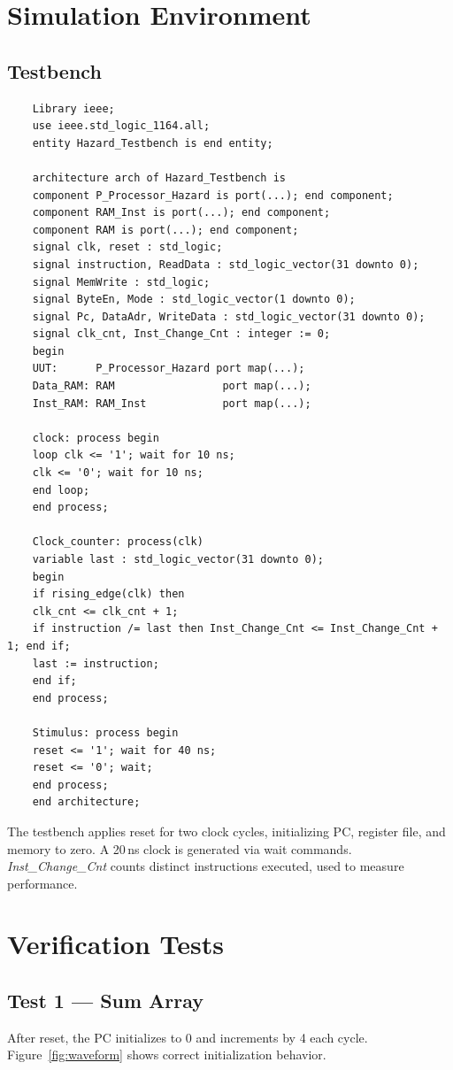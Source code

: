 \section{Simulation Environment}
\subsection{Testbench}
\begin{verbatim}
	Library ieee;
	use ieee.std_logic_1164.all;
	entity Hazard_Testbench is end entity;
	
	architecture arch of Hazard_Testbench is
	component P_Processor_Hazard is port(...); end component;
	component RAM_Inst is port(...); end component;
	component RAM is port(...); end component;
	signal clk, reset : std_logic;
	signal instruction, ReadData : std_logic_vector(31 downto 0);
	signal MemWrite : std_logic;
	signal ByteEn, Mode : std_logic_vector(1 downto 0);
	signal Pc, DataAdr, WriteData : std_logic_vector(31 downto 0);
	signal clk_cnt, Inst_Change_Cnt : integer := 0;
	begin
	UUT:      P_Processor_Hazard port map(...);
	Data_RAM: RAM                 port map(...);
	Inst_RAM: RAM_Inst            port map(...);
	
	clock: process begin
	loop clk <= '1'; wait for 10 ns;
	clk <= '0'; wait for 10 ns;
	end loop;
	end process;
	
	Clock_counter: process(clk)
	variable last : std_logic_vector(31 downto 0);
	begin
	if rising_edge(clk) then
	clk_cnt <= clk_cnt + 1;
	if instruction /= last then Inst_Change_Cnt <= Inst_Change_Cnt + 1; end if;
	last := instruction;
	end if;
	end process;
	
	Stimulus: process begin
	reset <= '1'; wait for 40 ns;
	reset <= '0'; wait;
	end process;
	end architecture;
\end{verbatim}

The testbench applies reset for two clock cycles, initializing PC, register file, and memory to zero. A 20\,ns clock is generated via wait commands. \textit{Inst\_Change\_Cnt} counts distinct instructions executed, used to measure performance.

\section{Verification Tests}

\subsection{Test 1 — Sum Array}
After reset, the PC initializes to 0 and increments by 4 each cycle. Figure~\ref{fig:waveform} shows correct initialization behavior.

